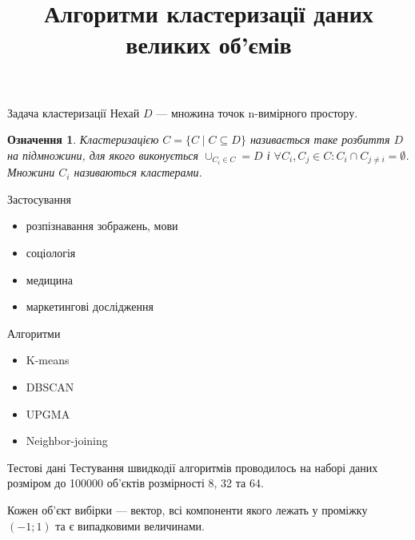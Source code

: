 \documentclass{beamer}
\title{Алгоритми кластеризації даних великих об’ємів}
\date{}
\newtheorem{defn}{Означення}
\begin{document}
    \begin{frame}
        \maketitle
    \end{frame}

    \begin{frame}{Задача кластеризації}
        Нехай $D$ --- множина точок n-вимірного простору. 
        \begin{defn}
            \emph{Кластеризацією} $C = \{C \mid C \subseteq D\}$ називається таке розбиття $D$ на підмножини, 
            для якого виконується $\cup_{C_i \in C} = D$ і $\forall C_i, C_j \in C : C_i \cap C_{j \neq i} = \emptyset$. 
            Множини $C_i$ називаються кластерами.
        \end{defn}
    \end{frame}
    
    
    \begin{frame}{Застосування}
        \begin{itemize}
            \item розпізнавання зображень, мови
            \item соціологія
            \item медицина
            \item маркетингові дослідження
        \end{itemize}
    \end{frame}
    
    
    \begin{frame}{Алгоритми}
        \begin{itemize}
            \item K-means
            \item DBSCAN
            \item UPGMA
            \item Neighbor-joining
        \end{itemize}
    \end{frame}
    
    \begin{frame}{Тестові дані}
        Тестування швидкодії алгоритмів проводилось на наборі даних розміром до 100000 об’єктів розмірності 8, 32 та 64.
        
        Кожен об’єкт вибірки --- вектор, всі компоненти якого лежать у проміжку $(-1; 1)$ та є випадковими величинами.
    \end{frame}
    
\end{document}

